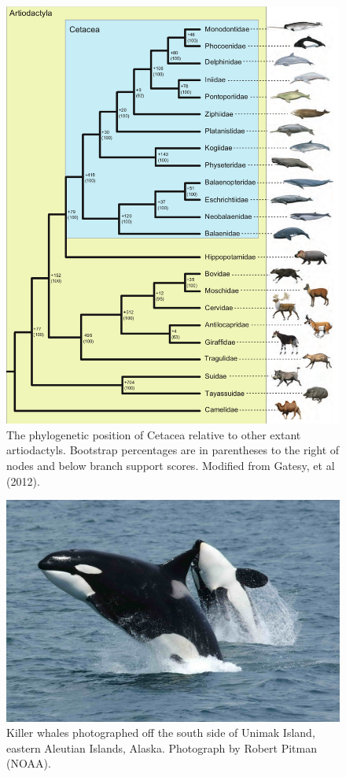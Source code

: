 \documentclass[10pt,letterpaper]{article}
\begin{document}
\begin{figure}

{\centering \includegraphics[width=0.5\linewidth]{figures/Gatesy_2012_phylogenetics_whale} 

}

\caption{\label{fig:tree01} The phylogenetic position of Cetacea relative to other extant artiodactyls. Bootstrap percentages are in parentheses to the right of nodes and below branch support scores. Modified from Gatesy, et al (2012).}\label{fig:unnamed-chunk-1}
\end{figure}
\begin{figure}

{\centering \includegraphics[width=0.8\linewidth]{figures/Killerwhales_jumping} 

}

\caption{\label{fig:photo_orca}Killer whales photographed off the south side of Unimak Island, eastern Aleutian Islands, Alaska. Photograph by Robert Pitman (NOAA).}\label{fig:unnamed-chunk-2}
\end{figure}
\end{document}
